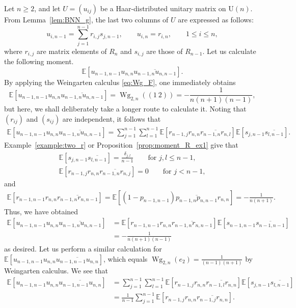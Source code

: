 \documentclass[10pt,a4paper]{amsart}
\numberwithin{equation}{section}
\theoremstyle{definition}
\newcommand{\UU}{\mathrm{U}}
\DeclareMathOperator{\Wg}{Wg}
\begin{document}
Let $n \ge 2$, and let $U=(u_{ij})$ be a Haar-distributed unitary matrix on $\UU(n)$.
From Lem\-ma~\ref{lem:BNN_g}, the last two columns of $U$ are expressed as follows:
\[
u_{i,n-1} = \sum_{j=1}^{n-1} r_{i,j} s_{j,n-1}, \qquad u_{i,n} =r_{i,n},
\qquad 1 \le i \le n,
\]
where $r_{i,j}$ are matrix elements of $R_n$ and $s_{i,j}$ are those of $R_{n-1}$.
Let us calculate the following moment.
\[
\mathbb{E} [ u_{n-1,n-1} u_{n,n} \overline{u_{n-1,n} u_{n, n-1}} ].
\]
By applying the Weingarten calculus \eqref{eq:Wg_F}, one immediately obtains
\[\mathbb{E} [ u_{n-1,n-1} u_{n,n} \overline{u_{n-1,n} u_{n, n-1}} ]=\Wg_{2,n}( (1 \ 2) ) = - \frac{1}{n(n+1)(n-1)},\]
but here, we shall deliberately take a longer route to calculate it.
Noting that $(r_{ij})$ and $(s_{ij})$ are independent, it follows that
\begin{align*}
 \mathbb{E} [ u_{n-1,n-1} u_{n,n} \overline{u_{n-1,n} u_{n, n-1}} ]
 =\sum_{j=1}^{n-1} \sum_{l=1}^{n-1} \mathbb{E} [r_{n-1,j} r_{n,n} \overline{r_{n-1,n} r_{n,l}}]
\mathbb{E}[s_{j,n-1} \overline{s_{l,n-1}}].
\end{align*}
Example~\ref{example:two_r} or Proposition~\ref{prop:moment_R_ex1} give that
\begin{gather*}
\mathbb{E}[s_{j,n-1} \overline{s_{l,n-1}}] = \frac{\delta_{j,l}}{n-1} \qquad \text{for $j,l \le n-1$}, \\
\mathbb{E} [r_{n-1,j} r_{n,n} \overline{r_{n-1,n} r_{n,j}}] =0 \qquad \text{for $j<n-1$},
\end{gather*}
and
\begin{align*}
\mathbb{E} [r_{n-1,n-1} r_{n,n} \overline{r_{n-1,n} r_{n,n-1}}]
 = \mathbb{E} [ (1-p_{n-1,n-1}) \overline{p_{n-1,n}p_{n,n-1}} r_{n,n}]
 = -\frac{1}{n(n+1)}.
\end{align*}
Thus, we have obtained
\begin{align*}
 \mathbb{E} [ u_{n-1,n-1} u_{n,n} \overline{u_{n-1,n} u_{n, n-1}} ]
 &=\mathbb{E} [r_{n-1,n-1} r_{n,n} \overline{r_{n-1,n} r_{n,n-1}}]
\mathbb{E}[s_{n-1,n-1} \overline{s_{n-1,n-1}}] \\
 &= -\frac{1}{n(n+1)(n-1)}
\end{align*}
as desired.
Let us perform a similar calculation for $\mathbb{E} \left[ u_{n-1,n-1} u_{n,n} \overline{u_{n-1,n-1} u_{n, n}} \right]$, which equals $\Wg_{2,n}(e_2)=\frac{1}{(n-1)(n+1)}$ by Weingarten calculus.
We see that
\begin{align*}
\mathbb{E} [ u_{n-1,n-1} u_{n,n} \overline{u_{n-1,n-1} u_{n, n}} ]
&= \sum_{j=1}^{n-1} \sum_{l=1}^{n-1} \mathbb{E} [r_{n-1,j} r_{n,n} \overline{r_{n-1,l} r_{n,n}}]
\mathbb{E}[s_{j,n-1} \overline{s_{l,n-1}}] \\
&= \frac{1}{n-1} \sum_{j=1}^{n-1} \mathbb{E} [r_{n-1,j} r_{n,n} \overline{r_{n-1,j} r_{n,n}}].
\end{align*}
\end{document}
